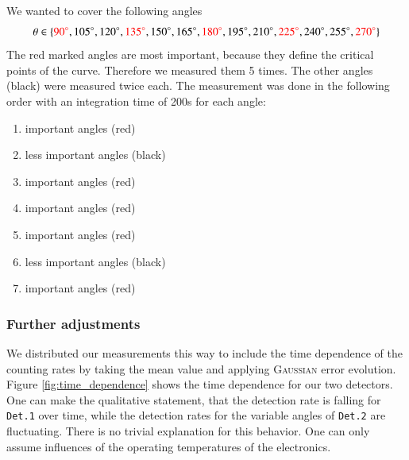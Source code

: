 \documentclass[11pt,a4paper,notitlepage]{scrartcl}
\begin{document}
We wanted to cover the following angles 
\begin{equation*}
	\theta\in\{\color{red}90^\circ\color{black},105^\circ,120^\circ,\color{red}135^\circ\color{black},150^\circ,165^\circ,\color{red}180^\circ\color{black},195^\circ,210^\circ,\color{red}225^\circ\color{black},240^\circ,255^\circ,\color{red}270^\circ\color{black}\}
\end{equation*}
The red marked angles are most important, because they define the critical points of the curve. Therefore we measured them 5 times. The other angles (black) were measured twice each.
The measurement was done in the following order with an integration time of 200s for each angle:
\begin{enumerate}
	\item important angles (red)
	\item less important angles (black)
	\item important angles (red)
	\item important angles (red)
	\item important angles (red)
	\item less important angles (black)
	\item important angles (red)
\end{enumerate}

\subsubsection{Further adjustments}
We distributed our measurements this way to include the time dependence of the counting rates by taking the mean value and applying \textsc{Gaussian} error evolution. Figure \ref{fig:time_dependence} shows the time dependence for our two detectors. One can make the qualitative statement, that the detection rate is falling for \texttt{Det.1} over time, while the detection rates for the variable angles of \texttt{Det.2} are fluctuating. There is no trivial explanation for this behavior. One can only assume influences of the operating temperatures of the electronics.
\end{document}
